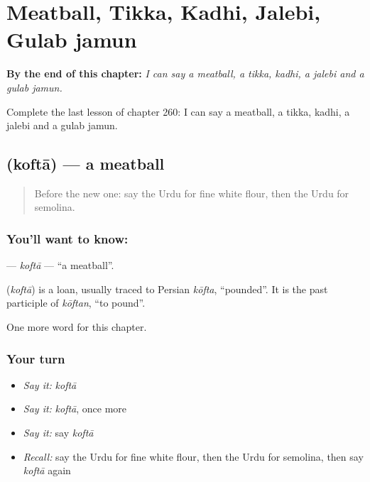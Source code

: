 
\chapter{Meatball, Tikka, Kadhi, Jalebi, Gulab jamun}
\label{ch:ur-meatball-tikka-kadhi-jalebi-gulab-jamun}

\begin{chapteropening}
\textbf{By the end of this chapter:} \emph{I can say a meatball, a tikka, kadhi, a jalebi and a gulab jamun.}

Complete the last lesson of chapter 260: I can say a meatball, a tikka, kadhi, a jalebi and a gulab jamun.
\end{chapteropening}

\section[\texorpdfstring{\ur{کوفتہ} (koftā)}{کوفتہ (koftā)}]{ (koftā) — a meatball}

\label{lesson:UR-C260-kofta}



\begin{quote}
Before the new one: say the Urdu for fine white flour, then the Urdu for semolina.
\end{quote}

\subsection*{You'll want to know: }
\textbf{} — \emph{koftā} — \textquotedblleft{}a meatball\textquotedblright{}.

\begin{cousinweb}
\textbf{} (\emph{koftā}) is a loan, usually traced to Persian \emph{kōfta}, \textquotedblleft{}pounded\textquotedblright{}. It is the past participle of \emph{kōftan}, \textquotedblleft{}to pound\textquotedblright{}.
\end{cousinweb}

\begin{grammarlens}[title={What you've built}]
One more word for this chapter.
\end{grammarlens}

\subsection*{Your turn}
\begin{itemize}
\raggedright
  \item \emph{Say it:} \emph{koftā}
  \item \emph{Say it:} \emph{koftā}, once more
  \item \emph{Say it:} say \emph{koftā}
  \item \emph{Recall:} say the Urdu for fine white flour, then the Urdu for semolina, then say \emph{koftā} again
\end{itemize}

